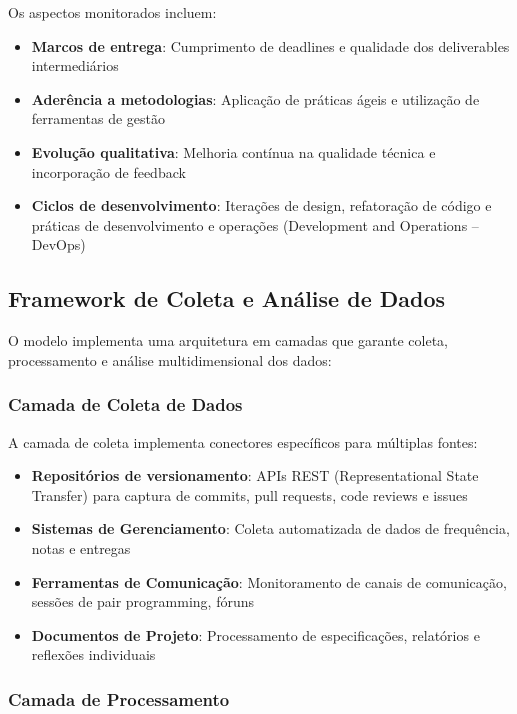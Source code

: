 \documentclass[english, spanish, brazilian]{modelo_dt}
\begin{document}
Os aspectos monitorados incluem:
\begin{itemize}
\item \textbf{Marcos de entrega}: Cumprimento de deadlines e qualidade dos deliverables intermediários
\item \textbf{Aderência a metodologias}: Aplicação de práticas ágeis e utilização de ferramentas de gestão
\item \textbf{Evolução qualitativa}: Melhoria contínua na qualidade técnica e incorporação de feedback
\item \textbf{Ciclos de desenvolvimento}: Iterações de design, refatoração de código e práticas de desenvolvimento e operações (Development and Operations -- DevOps)
\end{itemize}

\subsection{Framework de Coleta e Análise de Dados}

O modelo implementa uma arquitetura em camadas que garante coleta, processamento e análise multidimensional dos dados:

\subsubsection{Camada de Coleta de Dados}

A camada de coleta implementa conectores específicos para múltiplas fontes:
\begin{itemize}
\item \textbf{Repositórios de versionamento}: APIs REST (Representational State Transfer) para captura de commits, pull requests, code reviews e issues
\item \textbf{Sistemas de Gerenciamento}: Coleta automatizada de dados de frequência, notas e entregas
\item \textbf{Ferramentas de Comunicação}: Monitoramento de canais de comunicação, sessões de pair programming, fóruns
\item \textbf{Documentos de Projeto}: Processamento de especificações, relatórios e reflexões individuais
\end{itemize}

\subsubsection{Camada de Processamento}
\end{document}
